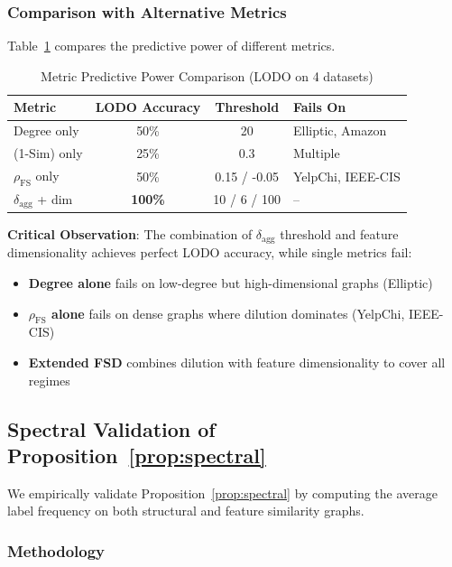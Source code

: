 \subsubsection{Comparison with Alternative Metrics}

Table~\ref{tab:metric_ablation} compares the predictive power of different metrics.

\begin{table}[t]
\centering
\caption{Metric Predictive Power Comparison (LODO on 4 datasets)}
\label{tab:metric_ablation}
\small
\begin{tabular}{lccl}
\toprule
\textbf{Metric} & \textbf{LODO Accuracy} & \textbf{Threshold} & \textbf{Fails On} \\
\midrule
Degree only & 50\% & 20 & Elliptic, Amazon \\
(1-Sim) only & 25\% & 0.3 & Multiple \\
$\rho_{\text{FS}}$ only & 50\% & 0.15 / -0.05 & YelpChi, IEEE-CIS \\
$\delta_{\text{agg}}$ + dim & \textbf{100\%} & 10 / 6 / 100 & -- \\
\bottomrule
\end{tabular}
\end{table}

\textbf{Critical Observation}: The combination of $\delta_{\text{agg}}$ threshold and feature dimensionality achieves perfect LODO accuracy, while single metrics fail:
\begin{itemize}
\item \textbf{Degree alone} fails on low-degree but high-dimensional graphs (Elliptic)
\item \textbf{$\rho_{\text{FS}}$ alone} fails on dense graphs where dilution dominates (YelpChi, IEEE-CIS)
\item \textbf{Extended FSD} combines dilution with feature dimensionality to cover all regimes
\end{itemize}

\subsection{Spectral Validation of Proposition~\ref{prop:spectral}}
\label{sec:spectral_validation}

We empirically validate Proposition~\ref{prop:spectral} by computing the average label frequency on both structural and feature similarity graphs.

\subsubsection{Methodology}


